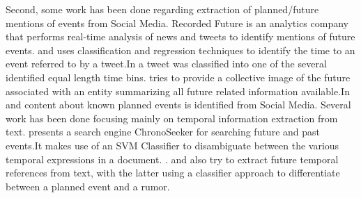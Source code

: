 Second, some work has been done regarding extraction of planned/future mentions of events from Social Media. Recorded Future\cite{recordedFuture} is an analytics company that performs real-time analysis of news and tweets to identify mentions of future events.\cite{tops2013predicting} and \cite{bosch2013estm}uses classification and regression techniques to identify the time to an event referred to by a tweet.In \cite{tops2013predicting} a tweet was classified into one of the several identified equal length time bins. \cite{Jatowt:2011:ECE} tries to provide a collective image of the future associated with an entity summarizing all future related information available.In \cite{Becker:2012:ICP} and \cite{Becker_automaticidentification} content about known planned events is identified from Social Media. 
Several work has been done focusing mainly on temporal information extraction from text.
\cite{Kawai:2010:CSE} presents a search engine ChronoSeeker for searching future and past events.It makes use of an SVM Classifier to disambiguate between the various temporal expressions in a document. .\cite{baeza2005searching} and \cite{dias2011future} also try to extract future temporal references from text, with the latter using a classifier approach to differentiate between a planned event and a rumor.
